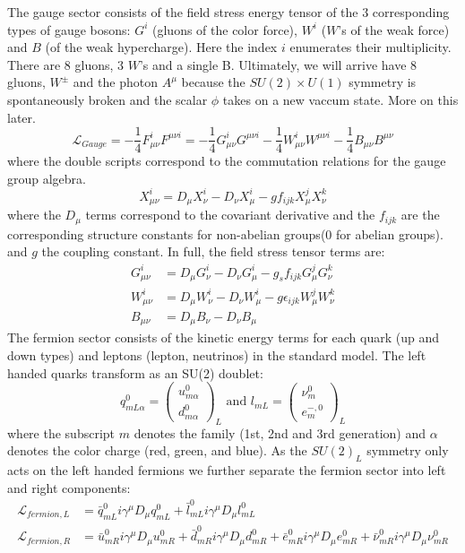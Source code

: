 The gauge sector consists of the field stress energy tensor of the 3 corresponding types of gauge bosons:
 $G^i$ (gluons of the color force), $W^i$ ($W$'s of the weak force) and $B$ (of the weak hypercharge). Here the index $i$ enumerates their multiplicity. There are 8 gluons, 3 $W$'s and a single B. Ultimately, we will arrive have 8 gluons, $W^{\pm}$ and the photon $A^\mu$ because the $SU(2)\times U(1)$ 
symmetry is spontaneously broken and the scalar $\phi$ takes on a new vaccum state. More on this later.
\begin{equation}
\mathcal{L}_{Gauge} = - \frac{1}{4} F_{\mu\nu}^{i} F^{\mu\nu i} =  - \frac{1}{4} G_{\mu\nu}^{i} G^{\mu\nu i} - \frac{1}{4} W^{i}_{\mu\nu} W^{\mu\nu i} - \frac{1}{4} B_{\mu\nu}B^{\mu\nu} 
\end{equation}
where the double scripts correspond to the commutation relations for the gauge group algebra. 
\begin{equation}
X_{\mu\nu}^i   = D_\mu X_\nu^i - D_\nu X_\mu^i - g f_{ijk} X_\mu^j X_\nu^k
\end{equation}
where the $D_\mu$ terms correspond to the covariant derivative and the $f_{ijk}$ are the corresponding structure constants for 
non-abelian groups(0 for abelian groups). and $g$ the coupling constant. In full, the field stress tensor terms are:
\begin{align*}
G_{\mu\nu}^i &=  D_\mu G_\nu^i - D_\nu G_\mu^i - g_s f_{ijk} G_\mu^j G_\nu^k\\ 
W_{\mu\nu}^i &=  D_\mu W_\nu^i - D_\nu W_\mu^i - g \epsilon_{ijk} W_\mu^j W_\nu^k\\ 
B_{\mu\nu} &=  D_\mu B_\nu - D_\nu B_\mu
\end{align*}
The fermion sector consists of the kinetic energy terms for each quark (up and down types) and leptons (lepton, neutrinos) in the standard model.
The left handed quarks transform as an SU(2) doublet:
\begin{equation}
q^0_{mL\alpha} = \left( \begin{array}{c} u_{m\alpha}^0  \\ d_{m\alpha}^0 \end{array} \right)_L \text{ and } l_{mL} = \left( \begin{array}{c} \nu_{m}^0  \\ e^{-,0}_{m} \end{array} \right)_L 
\end{equation}
where the subscript $m$ denotes the family (1st, 2nd and 3rd generation) and $\alpha$ denotes the color charge (red, green, and blue).
As the $SU(2)_L$ symmetry only acts on the left handed fermions we further separate the fermion sector into left and right components:
\begin{align*}
\mathcal{L}_{fermion,L} &= \bar{q}^0_{mL} i \gamma^\mu D_\mu q^0_{mL} + \bar{l}^0_{mL} i \gamma^\mu D_\mu l^0_{mL}\\
\mathcal{L}_{fermion,R} &=  \bar{u}^0_{mR} i \gamma^\mu D_\mu u^0_{mR} 
+ \bar{d}^0_{mR} i \gamma^\mu D_\mu d^0_{mR} + \bar{e}^0_{mR} i \gamma^\mu D_\mu e^0_{mR} + \bar{\nu}^0_{mR} i \gamma^\mu D_\mu \nu^0_{mR}
\end{align*}

